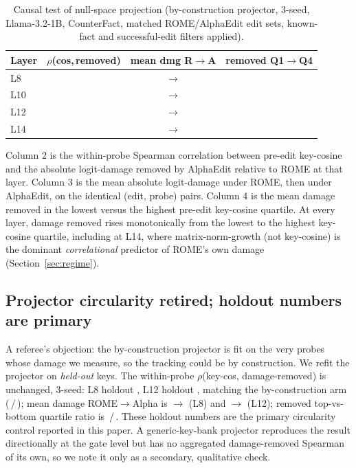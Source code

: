 \begin{table}[t]
\centering\small
\caption{Causal test of null-space projection (by-construction projector,
3-seed, Llama-3.2-1B, CounterFact, matched ROME/AlphaEdit edit sets, known-fact
and successful-edit filters applied).}
\label{tab:causal}
\setlength{\tabcolsep}{3pt}
\begin{tabular}{@{}lccc@{}}
\toprule
Layer & $\rho$(cos,\,removed) & mean dmg R$\rightarrow$A & removed Q1$\rightarrow$Q4 \\
\midrule
L8  & \cbcRhoLeight{}    & \cbcDmgLeightRome{}$\rightarrow$\cbcDmgLeightAlpha{}       & \cbcQuartLeight{} \\
L10 & \cbcRhoLten{}      & \cbcDmgLtenRome{}$\rightarrow$\cbcDmgLtenAlpha{}           & \cbcQuartLten{} \\
L12 & \cbcRhoLtwelve{}   & \cbcDmgLtwelveRome{}$\rightarrow$\cbcDmgLtwelveAlpha{}     & \cbcQuartLtwelve{} \\
L14 & \cbcRhoLfourteen{} & \cbcDmgLfourteenRome{}$\rightarrow$\cbcDmgLfourteenAlpha{} & \cbcQuartLfourteen{} \\
\bottomrule
\end{tabular}
\par\smallskip
{\footnotesize Column 2 is the within-probe Spearman correlation between pre-edit key-cosine and the absolute logit-damage removed by AlphaEdit relative to ROME at that layer. Column 3 is the mean absolute logit-damage under ROME, then under AlphaEdit, on the identical (edit, probe) pairs. Column 4 is the mean damage removed in the lowest versus the highest pre-edit key-cosine quartile. At every layer, damage removed rises monotonically from the lowest to the highest key-cosine quartile, including at L14, where matrix-norm-growth (not key-cosine) is the dominant \emph{correlational} predictor of ROME's own damage (Section~\ref{sec:regime}).\par}
\end{table}

\subsection{Projector circularity retired; holdout numbers are primary}
A referee's objection: the by-construction projector is fit on the very
probes whose damage we measure, so the tracking could be by construction. We
refit the projector on \emph{held-out} keys. The within-probe
$\rho$(key-cos, damage-removed) is unchanged, 3-seed: L8 holdout
\hoRhoLeight{}, L12 holdout \hoRhoLtwelve{}, matching the by-construction
arm (\cbcRhoLeight{}\,/\,\cbcRhoLtwelve{}); mean damage
ROME$\rightarrow$Alpha is \hoDmgLeightRome{}$\rightarrow$\hoDmgLeightAlpha{}
(L8) and \hoDmgLtwelveRome{}$\rightarrow$\hoDmgLtwelveAlpha{} (L12); removed
top-vs-bottom quartile ratio is \hoRatioLeight{}\,/\,\hoRatioLtwelve{}. These
holdout numbers are the primary circularity control reported in this paper.
A generic-key-bank projector reproduces the result directionally at the
gate level but has no aggregated damage-removed Spearman of its own, so we
note it only as a secondary, qualitative check.

